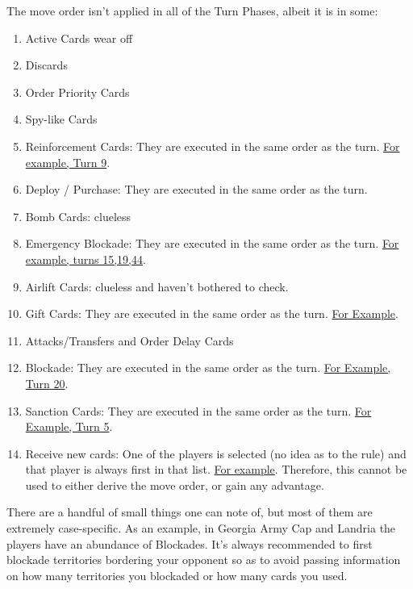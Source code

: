 The move order isn't applied in all of the Turn Phases, albeit it is in some:
\begin{enumerate}
    \item Active Cards wear off
    \item Discards
    \item Order Priority Cards
    \item Spy-like Cards
    \item Reinforcement Cards: They are executed in the same order as the turn. \href{https://www.warzone.com/MultiPlayer?GameID=40211798}{For example, Turn 9}.
    \item Deploy / Purchase: They are executed in the same order as the turn.
    \item Bomb Cards: clueless
    \item Emergency Blockade: They are executed in the same order as the turn. \href{https://www.warzone.com/MultiPlayer?GameID=37399642}{For example, turns 15,19,44}.
    \item Airlift Cards: clueless and haven't bothered to check.
    \item Gift Cards: They are executed in the same order as the turn. \href{https://www.warzone.com/MultiPlayer?GameID=40266635}{For Example}.
    \item Attacks/Transfers and Order Delay Cards
    \item Blockade: They are executed in the same order as the turn. \href{https://www.warzone.com/MultiPlayer?GameID=26656413}{For Example, Turn 20}.
    \item Sanction Cards: They are executed in the same order as the turn. \href{https://www.warzone.com/MultiPlayer?GameID=34305927}{For Example, Turn 5}.
    \item Receive new cards: One of the players is selected (no idea as to the rule) and that player is always first in that list. \href{https://www.warzone.com/MultiPlayer?GameID=33173841}{For example}. Therefore, this cannot be used to either derive the move order, or gain any advantage.
\end{enumerate}

There are a handful of small things one can note of, but most of them are extremely case-specific. As an example, in Georgia Army Cap and Landria the players have an abundance of Blockades. It's always recommended to first blockade territories bordering your opponent so as to avoid passing information on how many territories you blockaded or how many cards you used.

